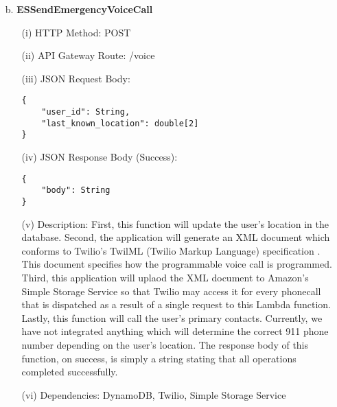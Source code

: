 \documentclass[10pt, a4paper]{article}
\begin{document}
\begin{enumerate}
	\item[b.] \textbf{ESSendEmergencyVoiceCall}
		\begin{itemize}		
		\item[(i)] HTTP Method: POST
		\item[(ii)] API Gateway Route: /voice
		\item[(iii)] JSON Request Body:
			\begin{lstlisting}
{
    "user_id": String,
    "last_known_location": double[2]
}
			\end{lstlisting}
		\item[(iv)] JSON Response Body (Success):
			\begin{lstlisting}
{
	"body": String
}
			\end{lstlisting}
		\item[(v)] Description: First, this function will update the user's location in the database. Second, the application will generate an XML document which conforms to Twilio's TwilML (Twilio Markup Language) specification \cite{two}. This document specifies how the programmable voice call is programmed. Third, this application will uplaod the XML document to Amazon's Simple Storage Service so that Twilio may access it for every phonecall that is dispatched as a result of a single request to this Lambda function. Lastly, this function will call the user's primary contacts. Currently, we have not integrated anything which will determine the correct 911 phone number depending on the user's location. The response body of this function, on success, is simply a string stating that all operations completed successfully.
		\item[(vi)] Dependencies: DynamoDB, Twilio, Simple Storage Service
		\end{itemize}
		

\end{enumerate}
\end{document}
